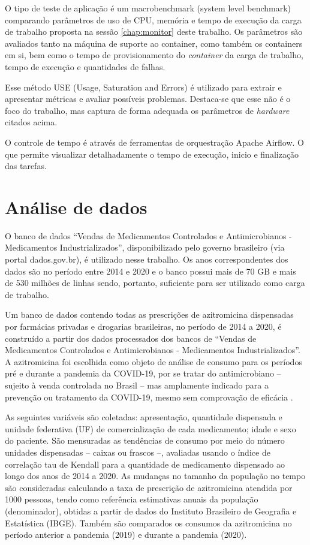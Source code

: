 O tipo de teste de aplicação é um macrobenchmark (system level benchmark) \cite{huge2008,scheepers2014virtualization} comparando parâmetros de uso de CPU, memória e tempo de execução da carga de trabalho proposta na sessão \ref{chap:monitor} deste trabalho. Os parâmetros são avaliados tanto na máquina de suporte ao container, como também os containers em si, bem como o tempo de provisionamento do  \emph{container} da carga de trabalho, tempo de execução e quantidades de falhas.

Esse método USE (Usage, Saturation and Errors) \cite{greg2022} é utilizado para extrair e apresentar métricas e avaliar possíveis problemas. Destaca-se que esse não é o foco do trabalho, mas captura de forma adequada os parâmetros de \emph{hardware} citados acima.

O controle de tempo é através de ferramentas de orquestração {Apache Airflow}\textregistered. O que permite visualizar detalhadamente o tempo de execução, inicio e finalização das tarefas.

\section{Análise de dados}

O banco de dados “Vendas de Medicamentos Controlados e Antimicrobianos - Medicamentos Industrializados”, disponibilizado pelo governo brasileiro (via portal dados.gov.br), é utilizado nesse trabalho. Os anos correspondentes dos dados são no período entre 2014 e 2020 e o banco possui mais de 70 GB  e mais de 530 milhões de linhas sendo, portanto, suficiente para ser utilizado como carga de trabalho.

Um banco de dados contendo todas as prescrições de azitromicina dispensadas por farmácias privadas
e drogarias brasileiras, no período de 2014 a 2020, é construído a partir dos dados processados dos
bancos de “Vendas de Medicamentos Controlados e Antimicrobianos - Medicamentos Industrializados”.
A azitromicina foi escolhida como objeto de análise de consumo para os períodos pré e durante a
pandemia da COVID-19, por se tratar do antimicrobiano – sujeito à venda controlada no Brasil – mas
amplamente indicado para a prevenção ou tratamento da COVID-19, mesmo sem comprovação de
eficácia \cite{santos2021kit}.

As seguintes variáveis são coletadas: apresentação, quantidade dispensada e unidade federativa (UF)
de comercialização de cada medicamento; idade e sexo do paciente.
São mensuradas as tendências de consumo por meio do número unidades dispensadas – caixas ou
frascos –, avaliadas usando o índice de correlação tau de Kendall para a quantidade de
medicamento dispensado ao longo dos anos de 2014 a 2020. As mudanças no tamanho da população
no tempo são consideradas calculando a taxa de prescrição de azitromicina atendida por
1000 pessoas, tendo como referência estimativas anuais da população (denominador), obtidas a partir
de dados do Instituto Brasileiro de Geografia e Estatística (IBGE). Também são comparados os
consumos da azitromicina no período anterior a pandemia (2019) e durante a pandemia (2020).


